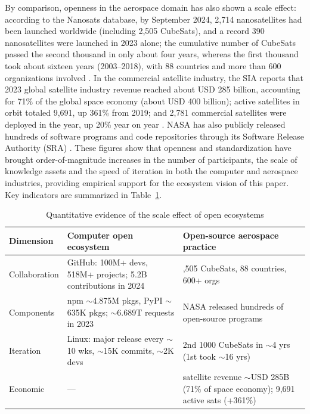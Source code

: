 \documentclass[11pt]{article}
\begin{document}
By comparison, openness in the aerospace domain has also shown a scale effect: according to the Nanosats database, by September 2024, 2,714 nanosatellites had been launched worldwide (including 2,505 CubeSats), and a record 390 nanosatellites were launched in 2023 alone; the cumulative number of CubeSats passed the second thousand in only about four years, whereas the first thousand took about sixteen years (2003--2018), with 88 countries and more than 600 organizations involved \cite{kulu2024}. In the commercial satellite industry, the SIA reports that 2023 global satellite industry revenue reached about USD 285 billion, accounting for 71\% of the global space economy (about USD 400 billion); active satellites in orbit totaled 9,691, up 361\% from 2019; and 2,781 commercial satellites were deployed in the year, up 20\% year on year \cite{sia2024}. NASA has also publicly released hundreds of software programs and code repositories through its Software Release Authority (SRA) \cite{nasa}. These figures show that openness and standardization have brought order-of-magnitude increases in the number of participants, the scale of knowledge assets and the speed of iteration in both the computer and aerospace industries, providing empirical support for the ecosystem vision of this paper. Key indicators are summarized in Table~\ref{tab:data}.

\begin{table}[htbp]
\centering
\footnotesize
\caption{Quantitative evidence of the scale effect of open ecosystems}
\label{tab:data}
\begin{tabularx}{\textwidth}{@{}>{\raggedright\arraybackslash}p{1.8cm}>{\raggedright\arraybackslash}X>{\raggedright\arraybackslash}X@{}}
\toprule
Dimension & Computer open ecosystem & Open-source aerospace practice \\
\midrule
Collaboration & GitHub: 100M+ devs, 518M+ projects; 5.2B contributions in 2024 \cite{octoverse2024} & 2,505 CubeSats, 88 countries, 600+ orgs \cite{kulu2024} \\
Components & npm $\sim$4.875M pkgs, PyPI $\sim$635K pkgs; $\sim$6.689T requests in 2023 \cite{sonatype2024} & NASA released hundreds of open-source programs \cite{nasa} \\
Iteration & Linux: major release every $\sim$10 wks, $\sim$15K commits, $\sim$2K devs \cite{lwn2023} & 2nd 1000 CubeSats in $\sim$4 yrs (1st took $\sim$16 yrs) \cite{kulu2024} \\
Economic & --- & 2023 satellite revenue $\sim$USD 285B (71\% of space economy); 9,691 active sats (+361\%) \cite{sia2024} \\
\bottomrule
\end{tabularx}
\end{table}
\end{document}
